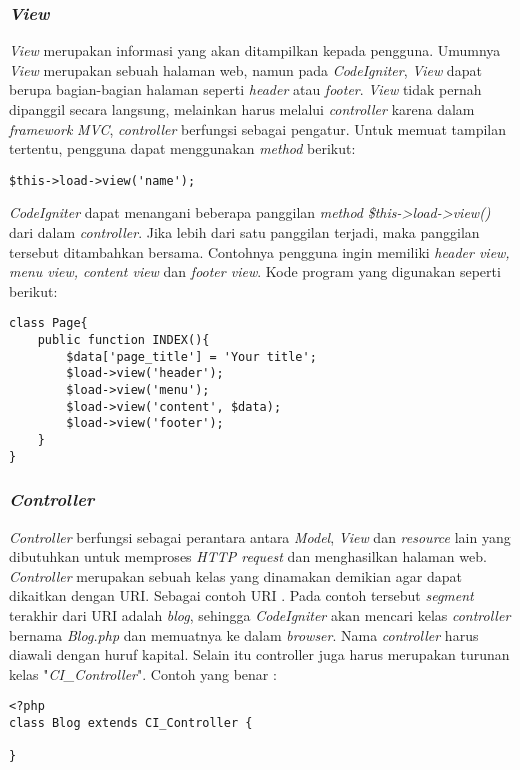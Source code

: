 	\subsubsection{\textit{View}}
	\textit{View} merupakan informasi yang akan ditampilkan kepada pengguna. Umumnya \textit{View} merupakan sebuah halaman web, namun pada \textit{CodeIgniter}, \textit{View} dapat berupa bagian-bagian halaman seperti \textit{header} atau \textit{footer}. \textit{View} tidak pernah dipanggil secara langsung, melainkan harus melalui \textit{controller} karena dalam \textit{framework} \textit{MVC}, \textit{controller} berfungsi sebagai pengatur. Untuk memuat tampilan tertentu, pengguna dapat menggunakan \textit{method} berikut:
	\begin{lstlisting}[basicstyle=\ttfamily, frame=single,
columns=fullflexible, keepspaces=true, breaklines=true]
$this->load->view('name');
\end{lstlisting}
	
	\textit{CodeIgniter} dapat menangani beberapa panggilan \textit{method} \textit{\$this->load->view()} dari dalam \textit{controller}. Jika lebih dari satu panggilan terjadi, maka panggilan tersebut ditambahkan bersama. Contohnya pengguna ingin memiliki \textit{header view, menu view, content view} dan \textit{footer view}. Kode program yang digunakan seperti berikut:
	\begin{lstlisting}[basicstyle=\ttfamily, frame=single,
columns=fullflexible, keepspaces=true, breaklines=true]
class Page{
	public function INDEX(){
		$data['page_title'] = 'Your title';
		$load->view('header');
		$load->view('menu');
		$load->view('content', $data);
		$load->view('footer');
	}
}
\end{lstlisting}
	
	\subsubsection{\textit{Controller}}
	\textit{Controller} berfungsi sebagai perantara antara \textit{Model}, \textit{View} dan \textit{resource} lain yang dibutuhkan untuk memproses \textit{HTTP request} dan menghasilkan halaman web. \textit{Controller} merupakan sebuah kelas yang dinamakan demikian agar dapat dikaitkan dengan URI. Sebagai contoh URI . Pada contoh tersebut \textit{segment} terakhir dari URI adalah \textit{blog}, sehingga \textit{CodeIgniter} akan mencari kelas \textit{controller} bernama \textit{Blog.php} dan memuatnya ke dalam \textit{browser}. Nama \textit{controller} harus diawali dengan huruf kapital. Selain itu controller juga harus merupakan turunan kelas "\textit{CI\_Controller}".
	Contoh yang benar :
\begin{lstlisting}[basicstyle=\ttfamily, frame=single,
columns=fullflexible, keepspaces=true, breaklines=true]
<?php
class Blog extends CI_Controller {

}
\end{lstlisting}
	
